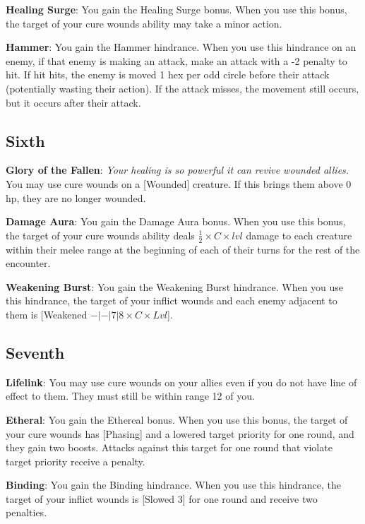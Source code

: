 \begin{multicols*}{2}
\textbf{Healing Surge}: You gain the Healing Surge bonus. When you use this bonus, the target of your cure wounds ability may take a minor action.

\textbf{Hammer}: You gain the Hammer hindrance. When you use this hindrance on an enemy, if that enemy is making an attack, make an attack with a -2 penalty to hit. If hit hits, the enemy is moved 1 hex per odd circle before their attack (potentially wasting their action). If the attack misses, the movement still occurs, but it occurs after their attack.

\subsection*{Sixth \Facet\perk}
\textbf{Glory of the Fallen}: \emph{Your healing is so powerful it can revive wounded allies.} You may use cure wounds on a [Wounded] creature. If this brings them above 0 hp, they are no longer wounded.

\textbf{Damage Aura}: You gain the Damage Aura bonus. When you use this bonus, the target of your cure wounds ability deals $\frac{1}{2} \times C \times lvl$ damage to each creature within their melee range at the beginning of each of their turns for the rest of the encounter.

\textbf{Weakening Burst}: You gain the Weakening Burst hindrance. When you use this hindrance, the target of your inflict wounds and each enemy adjacent to them is [Weakened $-|-|7|8 \times C \times Lvl$].

\subsection*{Seventh \Facet\perk}
\textbf{Lifelink}: You may use cure wounds on your allies even if you do not have line of effect to them. They must still be within range 12 of you.

\textbf{Etheral}: You gain the Ethereal bonus. When you use this bonus, the target of your cure wounds has [Phasing] and a lowered target priority for one round, and they gain two boosts. Attacks against this target for one round that violate target priority receive a penalty.

\textbf{Binding}: You gain the Binding hindrance. When you use this hindrance, the target of your inflict wounds is [Slowed 3] for one round and receive two penalties.
\end{multicols*}
